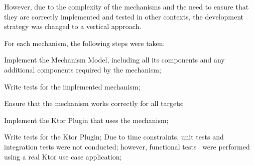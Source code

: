 However, due to the complexity of the mechanisms and the need to ensure that they are correctly implemented and tested
in other contexts, the development strategy was changed to a vertical approach.

For each mechanism, the following steps were taken:
\begin{boldenumerate}
    \item Implement the Mechanism Model, including all its components and any additional components required by the mechanism;
    \item Write tests for the implemented mechanism;
    \item Ensure that the mechanism works correctly for all targets;
    \item Implement the Ktor Plugin that uses the mechanism;
    \item Write tests for the Ktor Plugin;
    Due to time constraints, unit tests and integration tests were not conducted; however, functional tests~\cite{software-test-types} were performed using a real Ktor use case application;
\end{boldenumerate}
